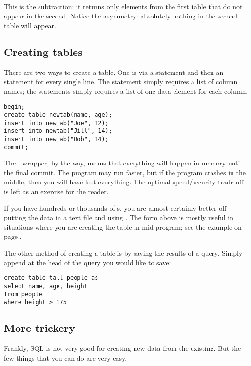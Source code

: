 \paragraph{} This is the subtraction: it returns only
elements from the first table that do not appear in the second. Notice
the asymmetry: absolutely nothing in the second table will appear. 

\subsection{Creating tables} There are two ways to create a table. One
is via  a  statement and then an  statement
for every single line. The  statement simply requires a
list of column names; the  statements simply requires a
list of one data element for each column.
\begin{lstlisting}
begin;
create table newtab(name, age);
insert into newtab("Joe", 12);
insert into newtab("Jill", 14);
insert into newtab("Bob", 14);
commit;
\end{lstlisting}
The - wrapper, by the way, means that everything will happen
in memory until the final commit. The program may run faster, but if
the program crashes in the middle, then you will have lost everything.
The optimal speed/security trade-off is left as an exercise for the
reader.

If you have hundreds or thousands of s, you are almost certainly better off putting the data
in a text file and using . The form
above is mostly useful in situations where you are creating the table in mid-program; see the example on page \pageref{createeg}.


The other method of creating a table is by saving the results of a
query. Simply append  at the head of the
query you would like to save: 
\begin{lstlisting}
create table tall_people as
select name, age, height 
from people
where height > 175
\end{lstlisting}



\subsection{More trickery} Frankly, SQL is not very good for
creating new data from the existing. But the few things that you can do
are very easy.

